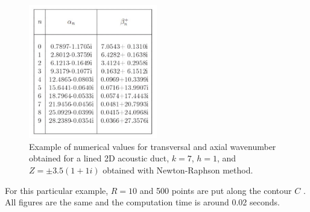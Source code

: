 \documentclass[a4paper,10pt]{article}
\renewcommand{\i}{\mathrm{i}}
\begin{document}
%


\begin{figure}
	\centering
		\includegraphics[width=0.50\textwidth]{sri.pdf}
	\caption{Example of numerical values\cite{Poernomo:2008} for transversal and axial wavenumber obtained for a lined 2D acoustic duct, $k=7$, $h=1$, and $Z=\pm 3.5(1+1i)$ obtained with Newton-Raphson method.}
	\label{fig:sri}
\end{figure}

For this particular example,  $R=10$ and 500 points are put along the contour $C$ . All figures are the same and the computation time is around 0.02 seconds.





\end{document}
